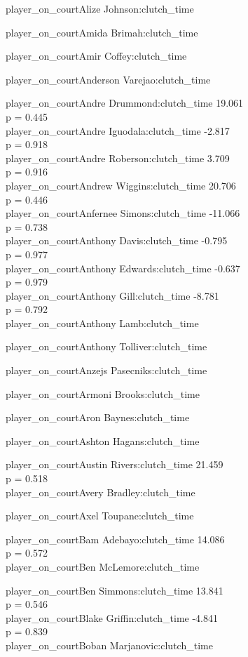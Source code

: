 \documentclass[
  landscape]{article}
\begin{document}
player\_on\_courtAlize Johnson:clutch\_time

player\_on\_courtAmida Brimah:clutch\_time

player\_on\_courtAmir Coffey:clutch\_time

player\_on\_courtAnderson Varejao:clutch\_time

player\_on\_courtAndre Drummond:clutch\_time 19.061\\
p = 0.445\\
player\_on\_courtAndre Iguodala:clutch\_time -2.817\\
p = 0.918\\
player\_on\_courtAndre Roberson:clutch\_time 3.709\\
p = 0.916\\
player\_on\_courtAndrew Wiggins:clutch\_time 20.706\\
p = 0.446\\
player\_on\_courtAnfernee Simons:clutch\_time -11.066\\
p = 0.738\\
player\_on\_courtAnthony Davis:clutch\_time -0.795\\
p = 0.977\\
player\_on\_courtAnthony Edwards:clutch\_time -0.637\\
p = 0.979\\
player\_on\_courtAnthony Gill:clutch\_time -8.781\\
p = 0.792\\
player\_on\_courtAnthony Lamb:clutch\_time

player\_on\_courtAnthony Tolliver:clutch\_time

player\_on\_courtAnzejs Pasecniks:clutch\_time

player\_on\_courtArmoni Brooks:clutch\_time

player\_on\_courtAron Baynes:clutch\_time

player\_on\_courtAshton Hagans:clutch\_time

player\_on\_courtAustin Rivers:clutch\_time 21.459\\
p = 0.518\\
player\_on\_courtAvery Bradley:clutch\_time

player\_on\_courtAxel Toupane:clutch\_time

player\_on\_courtBam Adebayo:clutch\_time 14.086\\
p = 0.572\\
player\_on\_courtBen McLemore:clutch\_time

player\_on\_courtBen Simmons:clutch\_time 13.841\\
p = 0.546\\
player\_on\_courtBlake Griffin:clutch\_time -4.841\\
p = 0.839\\
player\_on\_courtBoban Marjanovic:clutch\_time
\end{document}
